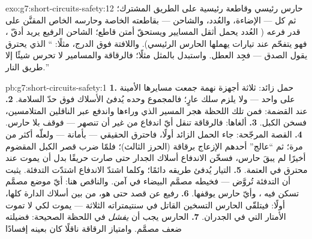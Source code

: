 \begin{solution}{exo:g7:short-circuits-safety:12}
حارس رئيسي وقاطعة رئيسية على الطريق المشترك؛ ثم كل  ---
الإضاءة، والعُدد، والشاحن --- بقاطعته الخاصة وحارسه الخاص
المقنَّن على قدر فرعه ( العُدد يحمل أثقل المسايير ويستحقّ
أمتن قاطع؛  الشاحن الرفيع يريد أدقّ ، فهو يتفحّم عند
تيارات يهملها الحارس الرئيسي). واللافتة فوق الدرج، مثلًا:
`` الذي يحترق يقول الصدق --- فجِد العطل. واستبدل بالمثل
مثلًا؛ فالرقاقة والمسامير لا تحرس شيئًا إلا طريق النار.''
\end{solution}

\begin{solution}{pb:g7:short-circuits-safety:1}
\textbf{1.} حمل زائد: ثلاثة أجهزة نهمة  جمعت مسايرها
الأمينة على  واحد --- ولا يلزم سلك عارٍ؛ فالمجموع وحده
يُدفئ الأسلاك فوق حدّ السلامة.
\textbf{2.}  عند القضمة: فمن تلك اللحظة هجر المسير
 الذي وراءها واندفع عبر الناقلين المتلامسين، فسخن
الكبل.
\textbf{3.} ألغاها: فالرقاقة تنقل أيّ اندفاع من غير أن تنصهر
--- فوقف  بلا حارس.
\textbf{4.} القصة المرجّحة: جاء الحمل الزائد أولًا، فاحترق
 الحقيقي --- بأمانة --- ولعلّه أكثر من مرة؛ ثم ``عالج''
أحدهم الإزعاج برقاقة (الحرز الثالث)؛ فلمّا ضرب قصر الكبل
المقضوم أخيرًا لم يبقَ حارس، فسخّن الاندفاع أسلاك الجدار حتى
صارت حريقًا بدل أن يموت عند  محترق في العتمة.
\textbf{5.} التيار يُدفئ طريقه دائمًا؛ وكلما اشتدّ الاندفاع
اشتدّت التدفئة.  يثبت أن التدفئة تُروَّض --- فخيطه
مصمَّم  البيضاء في  آمن. والناقص هنا: أيّ موضع
مصمَّم تسكن فيه ، وأيّ حارس يوقفها.
\textbf{6.} رفيع عن قصد حتى  هو، من بين أسلاك الدارة كلها،
أولًا: فيتلقّى الحارس التسخين القاتل في سنتيمتراته الثلاثة ---
يموت لكي لا تموت الأمتار التي في الجدران.
\textbf{7.} الحارس يجب أن \emph{يفشل} في اللحظة الصحيحة:
فضيلته ضعف مصمَّم. وامتياز الرقاقة ناقلًا كان بعينه إفسادًا

\end{solution}
